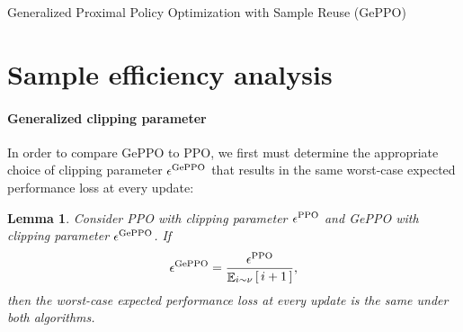 \documentclass{article}
\newtheorem{lemma}{Lemma}
\begin{document}
\begin{algorithm}[t]
\BlankLine
{}

\caption{Generalized Proximal Policy Optimization with Sample Reuse (GePPO)}\label{alg:geppo}
\end{algorithm}


\section{Sample efficiency analysis}\label{sec:analysis}

\paragraph{Generalized clipping parameter}

In order to compare GePPO to PPO, we first must determine the appropriate choice of clipping parameter $\epsilon^{\textnormal{GePPO}}$ that results in the same worst-case expected performance loss at every update:

\begin{lemma}\label{lem:geppo_param}
Consider PPO with clipping parameter $\epsilon^{\textnormal{PPO}}$ and GePPO with clipping parameter $\epsilon^{\textnormal{GePPO}}$. If 
\begin{equation}
\epsilon^{\textnormal{GePPO}} = \frac{\epsilon^{\textnormal{PPO}}}{ \mathop{\mathbb{E}}_{i \sim \nu} \left[ \, i + 1 \, \right]},
\end{equation}
then the worst-case expected performance loss at every update is the same under both algorithms.
\end{lemma}
\end{document}
